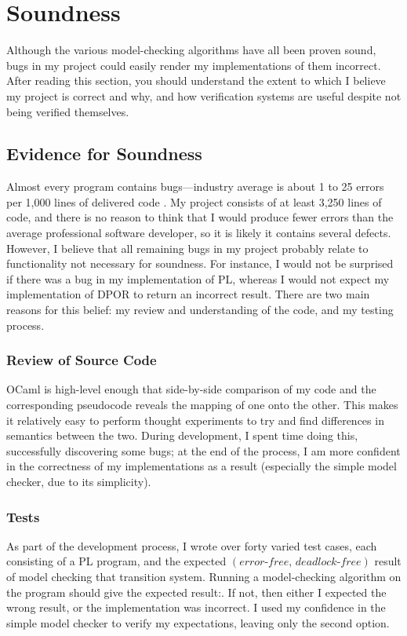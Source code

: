 \documentclass[12pt,a4paper,twoside,openright]{report}
\begin{document}
\section{Soundness}

Although the various model-checking algorithms
have all been proven sound, bugs in my
project could easily render my implementations
of them incorrect.
After reading this section, you should understand
the extent to which I believe
my project is correct and why, and how
verification systems are useful despite
not being verified themselves.

\subsection{Evidence for Soundness}
Almost every program contains bugs---industry average
is about 1 to 25 errors per 1,000 lines
of delivered code \cite{mccon04}.
My project consists of
at least 3,250 lines of code,
and there is no reason to think that I would
produce fewer errors than the average
professional software developer, so
it is likely it contains several defects.
However, I believe that
all remaining bugs in my project
probably relate
to functionality not necessary for
soundness. For instance, I would
not be surprised if there was a bug
in my implementation of PL,
whereas I would not expect
my implementation of DPOR to
return an incorrect result.
There are two main reasons
for this belief: my review and understanding
of the code, and my testing process.

\subsubsection{Review of Source Code}
OCaml is high-level enough that 
side-by-side comparison of my code
and the corresponding pseudocode reveals
the mapping of one onto the other. This
makes it relatively easy to perform
thought experiments to try and find
differences in semantics between the two.
During development, I spent time doing this,
successfully discovering some bugs; at
the end of the process, I am more
confident in the correctness of my implementations
as a result
(especially
the simple model checker,
due to its simplicity).

\subsubsection{Tests}
\label{sec:pl-checker-tests}
As part of the development process,
I wrote over forty varied test cases, each
consisting of a PL program, and
the expected
$(\textit{error-free},\, \textit{deadlock-free})$
result of model checking that transition
system.
Running a
model-checking algorithm on the
program should give the expected
result:. If not, then either
I expected the wrong result,
or the implementation was incorrect.
I used my confidence in the simple
model checker to verify
my expectations, leaving
only the second option.
\end{document}
